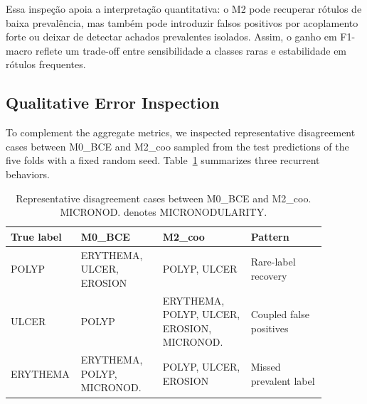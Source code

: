 \documentclass[12pt]{article}
\begin{document}

Essa inspeção apoia a interpretação quantitativa: o M2 pode recuperar rótulos de baixa prevalência, mas também pode introduzir falsos positivos por acoplamento forte ou deixar de detectar achados prevalentes isolados. Assim, o ganho em F1-macro reflete um trade-off entre sensibilidade a classes raras e estabilidade em rótulos frequentes.

\subsection{Qualitative Error Inspection}

To complement the aggregate metrics, we inspected representative disagreement cases between M0\_BCE and M2\_coo sampled from the test predictions of the five folds with a fixed random seed. Table~\ref{tab:error-analysis} summarizes three recurrent behaviors.

\begin{table}[htbp]
\centering
\caption{Representative disagreement cases between M0\_BCE and M2\_coo. MICRONOD. denotes MICRONODULARITY.}
\label{tab:error-analysis}
\footnotesize
\setlength{\tabcolsep}{3pt}
\renewcommand{\arraystretch}{1.12}
\begin{tabular}{
>{\raggedright\arraybackslash}p{0.13\linewidth}
>{\raggedright\arraybackslash}p{0.25\linewidth}
>{\raggedright\arraybackslash}p{0.27\linewidth}
>{\raggedright\arraybackslash}p{0.23\linewidth}
}
\hline
\textbf{True label} & \textbf{M0\_BCE} & \textbf{M2\_coo} & \textbf{Pattern} \\
\hline
POLYP & ERYTHEMA, ULCER, EROSION & POLYP, ULCER & Rare-label recovery \\
ULCER & POLYP & ERYTHEMA, POLYP, ULCER, EROSION, MICRONOD. & Coupled false positives \\
ERYTHEMA & ERYTHEMA, POLYP, MICRONOD. & POLYP, ULCER, EROSION & Missed prevalent label \\
\hline
\end{tabular}
\end{table}
\end{document}
